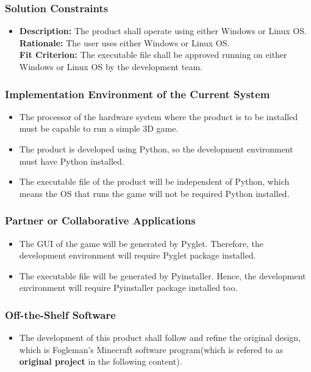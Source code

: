 \documentclass[12pt, titlepage]{article}
\begin{document}
\subsubsection{Solution Constraints}
\begin{itemize}
        \item \textbf{Description:} The product shall operate using either Windows or Linux OS.\\
                    \textbf{Rationale:} The user uses either Windows or Linux OS.\\
                    \textbf{Fit Criterion:} The executable file shall be approved running on either Windows or Linux OS by the development team.
\end{itemize}
\subsubsection{Implementation Environment of the Current System}
\begin{itemize}
        \item The processor of the hardware system where the product is to be installed must be capable to run a simple 3D game.
        \item The product is developed using Python, so the development environment must have Python installed.
        \item The executable file of the product will be independent of Python, which means the OS that runs the game will not be required Python installed.
\end{itemize}
\subsubsection{Partner or Collaborative Applications}
\begin{itemize}
        \item The GUI of the game will be generated by Pyglet. Therefore, the development environment will require Pyglet package installed.
        \item The executable file will be generated by Pyinstaller. Hence, the development environment will require Pyinstaller package installed too.
\end{itemize}
\subsubsection{Off-the-Shelf Software}
\begin{itemize}
        \item The development of this product shall follow and refine the original design, which is Fogleman's Minecraft software program\cite{mine}(which is refered to as \textbf{original project} in the following content).
\end{itemize}
\end{document}
